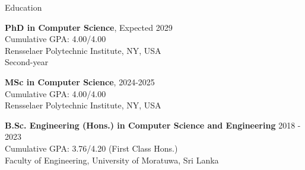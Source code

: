 \documentclass{resume} %
\begin{document}

\begin{rSection}{Education}

{\bf PhD in Computer Science}, \hfill {Expected 2029}\\
Cumulative GPA: 4.00/4.00\\
Rensselaer Polytechnic Institute, NY, USA \\
Second-year 

{\bf MSc in Computer Science}, \hfill {2024-2025}\\
Cumulative GPA: 4.00/4.00\\
Rensselaer Polytechnic Institute, NY, USA 

{\bf B.Sc. Engineering (Hons.) in Computer Science and Engineering} \hfill {2018 - 2023}\\
Cumulative GPA: 3.76/4.20 (First Class Hons.) \\
Faculty of Engineering,
University of Moratuwa, Sri Lanka 
\end{rSection}



\end{document}

